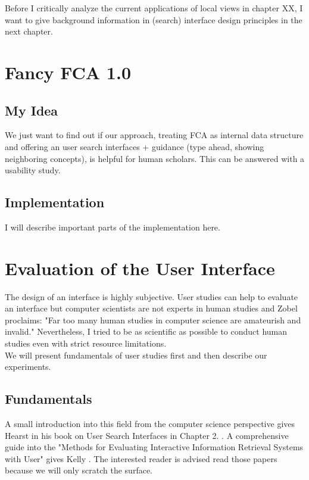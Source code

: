 \documentclass[11pt]{report}
\begin{document}
Before I critically analyze the current applications of local views in chapter XX, I want to give background information in (search) interface design principles in the next chapter.


\chapter{Fancy FCA 1.0}

\section{My Idea}

We just want to find out if our approach, treating FCA as internal data structure and offering an user search interfaces + guidance (type ahead, showing neighboring concepts), is helpful for human scholars. This can be answered with a usability study.

\section{Implementation}

I will describe important parts of the implementation here.

\chapter{Evaluation of the User Interface}

The design of an interface is highly subjective. User studies can help to evaluate an interface but computer scientists are not experts in human studies and Zobel \cite{Zobel2004} proclaims: "Far too many human studies in computer science are amateurish and invalid." Nevertheless, I tried to be as scientific as possible to conduct human studies even with strict resource limitations. \\

We will present fundamentals of user studies first and then describe our experiments.

\section{Fundamentals}

A small introduction into this field from the computer science perspective gives Hearst in his book on User Search Interfaces in Chapter 2. \cite{Hearst2009}. A comprehensive guide into the "Methods for Evaluating Interactive Information Retrieval Systems with User" gives Kelly \cite{Kelly2007} . The interested reader is advised read those papers because we will only scratch the surface. \\ 
\end{document}
